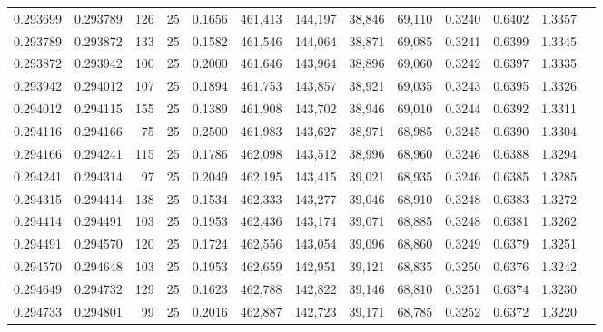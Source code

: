 \begin{tabular}{rrrrrrrrrrrrr}
0.293699 & 0.293789 &   126 &  25 &                                     0.1656 & 461,413 & 144,197 &  38,846 &  69,110 & 0.3240 & 0.6402 & 1.3357 \\
0.293789 & 0.293872 &   133 &  25 &                                     0.1582 & 461,546 & 144,064 &  38,871 &  69,085 & 0.3241 & 0.6399 & 1.3345 \\
0.293872 & 0.293942 &   100 &  25 &                                     0.2000 & 461,646 & 143,964 &  38,896 &  69,060 & 0.3242 & 0.6397 & 1.3335 \\
0.293942 & 0.294012 &   107 &  25 &                                     0.1894 & 461,753 & 143,857 &  38,921 &  69,035 & 0.3243 & 0.6395 & 1.3326 \\
0.294012 & 0.294115 &   155 &  25 &                                     0.1389 & 461,908 & 143,702 &  38,946 &  69,010 & 0.3244 & 0.6392 & 1.3311 \\
0.294116 & 0.294166 &    75 &  25 &                                     0.2500 & 461,983 & 143,627 &  38,971 &  68,985 & 0.3245 & 0.6390 & 1.3304 \\
0.294166 & 0.294241 &   115 &  25 &                                     0.1786 & 462,098 & 143,512 &  38,996 &  68,960 & 0.3246 & 0.6388 & 1.3294 \\
0.294241 & 0.294314 &    97 &  25 &                                     0.2049 & 462,195 & 143,415 &  39,021 &  68,935 & 0.3246 & 0.6385 & 1.3285 \\
0.294315 & 0.294414 &   138 &  25 &                                     0.1534 & 462,333 & 143,277 &  39,046 &  68,910 & 0.3248 & 0.6383 & 1.3272 \\
0.294414 & 0.294491 &   103 &  25 &                                     0.1953 & 462,436 & 143,174 &  39,071 &  68,885 & 0.3248 & 0.6381 & 1.3262 \\
0.294491 & 0.294570 &   120 &  25 &                                     0.1724 & 462,556 & 143,054 &  39,096 &  68,860 & 0.3249 & 0.6379 & 1.3251 \\
0.294570 & 0.294648 &   103 &  25 &                                     0.1953 & 462,659 & 142,951 &  39,121 &  68,835 & 0.3250 & 0.6376 & 1.3242 \\
0.294649 & 0.294732 &   129 &  25 &                                     0.1623 & 462,788 & 142,822 &  39,146 &  68,810 & 0.3251 & 0.6374 & 1.3230 \\
0.294733 & 0.294801 &    99 &  25 &                                     0.2016 & 462,887 & 142,723 &  39,171 &  68,785 & 0.3252 & 0.6372 & 1.3220 \\

\end{tabular}
